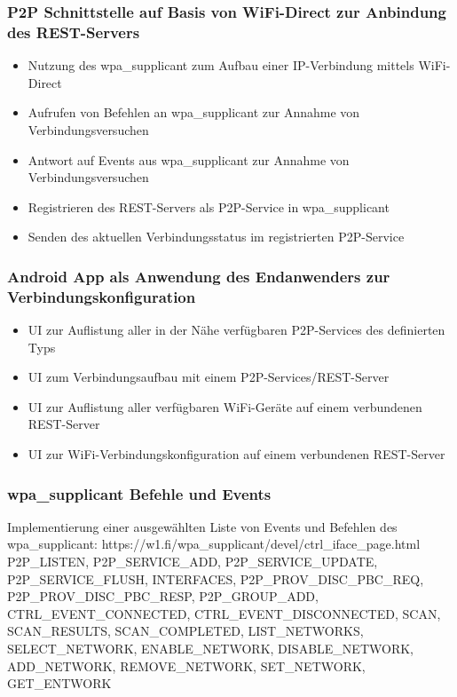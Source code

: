 \documentclass[12pt,a4paper]{article}
\begin{document}
\subsubsection*{P2P Schnittstelle auf Basis von WiFi-Direct zur Anbindung des REST-Servers}
	\begin{itemize}
	\item Nutzung des wpa\_supplicant zum Aufbau einer IP-Verbindung mittels WiFi-Direct
	\item Aufrufen von Befehlen an wpa\_supplicant zur Annahme von Verbindungsversuchen 
	\item Antwort auf Events aus wpa\_supplicant zur Annahme von Verbindungsversuchen
	\item Registrieren des REST-Servers als P2P-Service in wpa\_supplicant
	\item Senden des aktuellen Verbindungsstatus im registrierten P2P-Service
	\end{itemize}
\subsubsection*{Android App als Anwendung des Endanwenders zur Verbindungskonfiguration}
	\begin{itemize}
	\item UI zur Auflistung aller in der Nähe verfügbaren P2P-Services des definierten Typs
	\item UI zum Verbindungsaufbau mit einem P2P-Services/REST-Server
	\item UI zur Auflistung aller verfügbaren WiFi-Geräte auf einem verbundenen REST-Server
	\item UI zur WiFi-Verbindungskonfiguration auf einem verbundenen REST-Server
	\end{itemize}
\subsubsection*{wpa\_supplicant Befehle und Events}
	Implementierung einer ausgewählten Liste von Events und Befehlen des wpa\_supplicant:\linebreak
	https://w1.fi/wpa\_supplicant/devel/ctrl\_iface\_page.html\linebreak
	P2P\_LISTEN, P2P\_SERVICE\_ADD, P2P\_SERVICE\_UPDATE,\linebreak
	P2P\_SERVICE\_FLUSH, INTERFACES, P2P\_PROV\_DISC\_PBC\_REQ,\linebreak
	P2P\_PROV\_DISC\_PBC\_RESP, P2P\_GROUP\_ADD, CTRL\_EVENT\_CONNECTED,\linebreak
	CTRL\_EVENT\_DISCONNECTED, SCAN, SCAN\_RESULTS, SCAN\_COMPLETED, LIST\_NETWORKS, SELECT\_NETWORK, ENABLE\_NETWORK,\linebreak
	DISABLE\_NETWORK, ADD\_NETWORK, REMOVE\_NETWORK,\linebreak
	SET\_NETWORK, GET\_ENTWORK \linebreak
\end{document}

